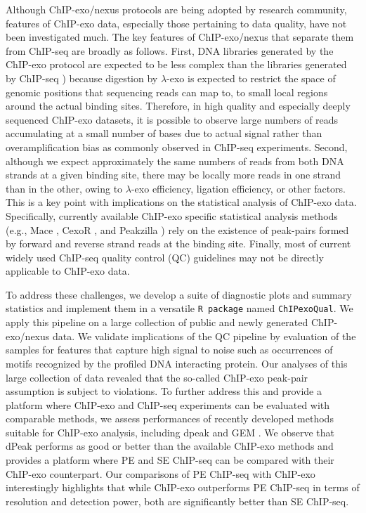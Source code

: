 \documentclass{bmcart}
\newcommand{\pname}[1]{\texttt{ChIPexoQual}}
\begin{document}
Although ChIP-exo/nexus protocols are being adopted by research
community, features of ChIP-exo data, especially those pertaining to
data quality, have not been investigated much. The key features of
ChIP-exo/nexus that separate them from ChIP-seq are broadly as
follows. First, DNA libraries generated by the ChIP-exo protocol are
expected to be less complex than the libraries generated by ChIP-seq
\cite{exo_review}) because digestion by $\lambda$-exo is expected to
restrict the space of genomic positions that sequencing reads can map
to, to small local regions around the actual binding sites. Therefore,
in high quality and especially deeply sequenced ChIP-exo datasets, it
is possible to observe large numbers of reads accumulating at a small
number of bases due to actual signal rather than overamplification
bias as commonly observed in ChIP-seq experiments.  Second, although
we expect approximately the same numbers of reads from both DNA
strands at a given binding site, there may be locally more reads in
one strand than in the other, owing to $\lambda$-exo efficiency,
ligation efficiency, or other factors.  This is a key point with
implications on the statistical analysis of ChIP-exo
data. Specifically, currently available ChIP-exo specific statistical
analysis methods (e.g., Mace \cite{mace}, CexoR \cite{cexor}, and
Peakzilla \cite{peakzilla}) rely on the existence of peak-pairs formed
by forward and reverse strand reads at the binding site.  Finally,
most of current widely used ChIP-seq quality control (QC) guidelines
\cite{encode_qc} may not be directly applicable to ChIP-exo data.

To address these challenges, we develop a suite of diagnostic plots
and summary statistics and implement them in a versatile \texttt{R
  package} named \pname{}.  We apply this pipeline on a large
collection of public and newly generated ChIP-exo/nexus data. We
validate implications of the QC pipeline by evaluation of the samples
for features that capture high signal to noise such as occurrences of
motifs recognized by the profiled DNA interacting protein. Our
analyses of this large collection of data revealed that the so-called
ChIP-exo peak-pair assumption is subject to violations. To further
address this and provide a platform where ChIP-exo and ChIP-seq
experiments can be evaluated with comparable methods, we assess
performances of recently developed methods suitable for ChIP-exo
analysis, including dpeak \cite{dpeak} and GEM \cite{gem}. We observe
that dPeak performs as good or better than the available ChIP-exo
methods and provides a platform where PE and SE ChIP-seq can be
compared with their ChIP-exo counterpart. Our comparisons of PE
ChIP-seq with ChIP-exo interestingly highlights that while ChIP-exo
outperforms PE ChIP-seq in terms of resolution and detection power,
both are significantly better than SE ChIP-seq.
\end{document}
